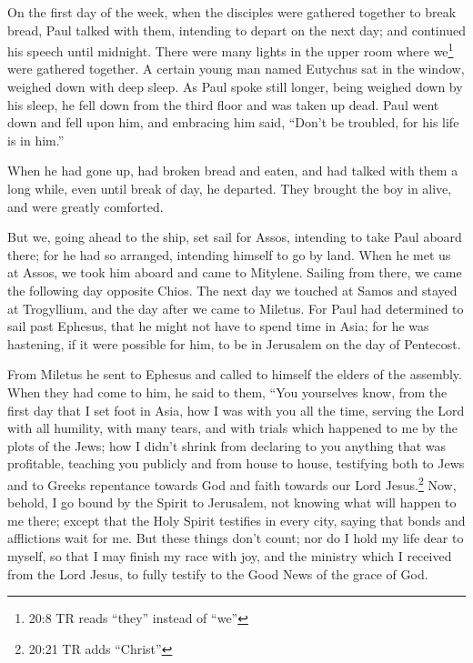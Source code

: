  On the first day of the week, when the disciples were
gathered together to break bread, Paul talked with them, intending to
depart on the next day; and continued his speech until midnight.
 There were many lights in the upper room where
we\footnote{20:8 TR reads ``they'' instead of ``we''} were gathered
together.  A certain young man named Eutychus sat in the
window, weighed down with deep sleep. As Paul spoke still longer, being
weighed down by his sleep, he fell down from the third floor and was
taken up dead.  Paul went down and fell upon him, and
embracing him said, ``Don't be troubled, for his life is in him.''

 When he had gone up, had broken bread and eaten, and had
talked with them a long while, even until break of day, he departed.
 They brought the boy in alive, and were greatly comforted.

 But we, going ahead to the ship, set sail for Assos,
intending to take Paul aboard there; for he had so arranged, intending
himself to go by land.  When he met us at Assos, we took
him aboard and came to Mitylene.  Sailing from there, we
came the following day opposite Chios. The next day we touched at Samos
and stayed at Trogyllium, and the day after we came to Miletus.
 For Paul had determined to sail past Ephesus, that he
might not have to spend time in Asia; for he was hastening, if it were
possible for him, to be in Jerusalem on the day of Pentecost.

 From Miletus he sent to Ephesus and called to himself the
elders of the assembly.  When they had come to him, he said
to them, ``You yourselves know, from the first day that I set foot in
Asia, how I was with you all the time,  serving the Lord
with all humility, with many tears, and with trials which happened to me
by the plots of the Jews;  how I didn't shrink from
declaring to you anything that was profitable, teaching you publicly and
from house to house,  testifying both to Jews and to Greeks
repentance towards God and faith towards our Lord Jesus.\footnote{20:21
  TR adds ``Christ''}  Now, behold, I go bound by the
Spirit to Jerusalem, not knowing what will happen to me there;
 except that the Holy Spirit testifies in every city,
saying that bonds and afflictions wait for me.  But these
things don't count; nor do I hold my life dear to myself, so that I may
finish my race with joy, and the ministry which I received from the Lord
Jesus, to fully testify to the Good News of the grace of God.

